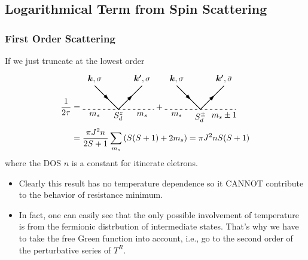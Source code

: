 \documentclass[10pt,aspectratio=43,xcolor=x11names,t]{beamer}%
\begin{document}
	\subsection{Logarithmical Term from Spin Scattering}
		\begin{frame}\frametitle{First Order Scattering}
			If we just truncate at the lowest order
			\begin{align*}
				\dfrac{1}{2\tau}&=\begin{tikzpicture}[baseline]
					\draw[thick,dashed] (-1.5,0)--(1.5,0);
					\draw[thick] (-1,1)--(0,0)--(1,1);
					\node[below] at (1,0) {$m_s$};
					\node[below] at (-1,0) {$m_s$};
					\node[below] at (0,0) {$S_d^z$};
					\node[rotate=-45] at (-0.5,0.5) {\arrow};
					\node[above] at (-1,1) {$\bm{k},\sigma$};
					\node[above] at (1,1) {$\bm{k'},\sigma$};
					\node[rotate=45] at (0.5,0.5) {\arrow};
				\end{tikzpicture}+
				\begin{tikzpicture}[baseline]
					\draw[thick,dashed] (-1.5,0)--(1.5,0);
					\draw[thick] (-1,1)--(0,0)--(1,1);
					\node[below] at (1,0) {$m_s\pm1$};
					\node[below] at (-1,0) {$m_s$};
					\node[below] at (0,0) {$S_d^\pm$};
					\node[rotate=-45] at (-0.5,0.5) {\arrow};
					\node[above] at (-1,1) {$\bm{k},\sigma$};
					\node[above] at (1,1) {$\bm{k'},\bar{\sigma}$};
					\node[rotate=45] at (0.5,0.5) {\arrow};
				\end{tikzpicture}\nonumber\\
				&=\dfrac{\pi J^2 n}{2S+1}\sum_{m_s}\left(S(S+1)+2m_s\right)=\pi J^2 nS(S+1)
			\end{align*}
			where the DOS $n$ is a constant for itinerate eletrons.
			\pause
			\begin{itemize}
				\item Clearly this result has no temperature dependence so it CANNOT contribute to the behavior of resistance minimum.
				\item In fact, one can easily see that {\color{blue}the only possible involvement of temperature is from the fermionic distrbution of intermediate states}. That's why we have to take the free Green function into account, i.e., go to the second order of the perturbative series of $T^R$.
			\end{itemize}
		\end{frame}
\end{document}
